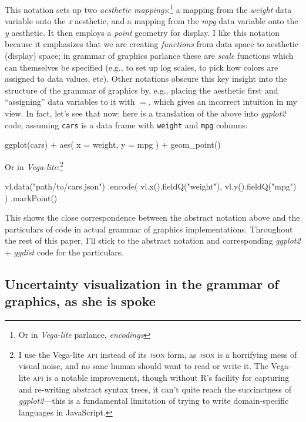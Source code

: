 \documentclass[journal]{vgtc}                     %
\newenvironment{centerverbatim}{%
  \hfill\break
  \centering
  \varwidth{\linewidth}%
  \verbatim
}{%
  \endverbatim
  \endvarwidth
  \par
  \hfill\break
}
\begin{document}
This notation sets up two \textit{aesthetic mappings}:\footnote{Or in \textit{Vega-lite} parlance, \textit{encodings}} a mapping from the \textit{weight} data variable onto the \textit{x} aesthetic, and a mapping from the \textit{mpg} data variable onto the \textit{y} aesthetic. It then employs a \textit{point} geometry for display. I like this notation because it emphasizes that we are creating \textit{functions} from data space to aesthetic (display) space; in grammar of graphics parlance these are \textit{scale} functions which can themselves be specified (e.g., to set up log scales, to pick how colors are assigned to data values, etc). Other notations obscure this key insight into the structure of the grammar of graphics by, e.g., placing the aesthetic first and ``assigning'' data variables to it with $=$, which gives an incorrect intuition in my view. In fact, let's see that now: here is a translation of the above into \textit{ggplot2} code, assuming \texttt{cars} is a data frame with \texttt{weight} and \texttt{mpg} columns:

\begin{centerverbatim}
ggplot(cars) +
  aes(
    x = weight,
    y = mpg
  ) +
  geom_point()
\end{centerverbatim}

Or in \textit{Vega-lite}:\footnote{I use the Vega-lite \textsc{api} instead of its \textsc{json} form, as \textsc{json} is a horrifying mess of visual noise, and no sane human should want to read or write it. The Vega-lite \textsc{api} is a notable improvement, though without R's facility for capturing and re-writing abstract syntax trees, it can't quite reach the succinctness of \textit{ggplot2}---this is a fundamental limitation of trying to write domain-specific languages in JavaScript.}

\begin{centerverbatim}
vl.data("path/to/cars.json")
  .encode(
    vl.x().fieldQ("weight"),
    vl.y().fieldQ("mpg")
  )
  .markPoint()
\end{centerverbatim}

This shows the close correspondence between the abstract notation above and the particulars of code in actual grammar of graphics implementations. Throughout the rest of this paper, I'll stick to the abstract notation and corresponding \textit{ggplot2} + \textit{ggdist} code for the particulars.

\subsection{Uncertainty visualization in the grammar of graphics, as she is spoke}
\end{document}
